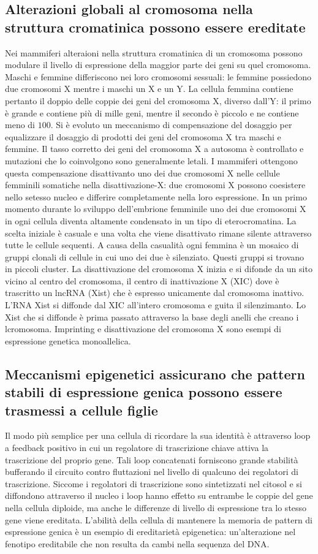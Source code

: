 \subsection{Alterazioni globali al cromosoma nella struttura cromatinica possono essere ereditate}
Nei mammiferi alteraioni nella struttura cromatinica di un cromosoma possono modulare il livello di espressione della maggior parte dei geni su quel cromosoma. Maschi e femmine 
differiscono nei loro cromosomi sessuali: le femmine possiedono due cromosomi X mentre i maschi un X e un Y. La cellula femmina contiene pertanto il doppio delle coppie dei geni del 
cromosoma X, diverso dall'Y: il primo \`e grande e contiene pi\`u di mille geni, mentre il secondo \`e piccolo e ne contiene meno di $100$. Si \`e evoluto un meccanismo di compensazione
del dosaggio per equalizzare il dosaggio di prodotti dei geni del cromosoma X tra maschi e femmine. Il tasso corretto dei geni del cromosoma X a autosoma \`e controllato e mutazioni che
lo coinvolgono sono generalmente letali. I mammiferi ottengono questa compensazione disattivanto uno dei due cromosomi X nelle cellule femminili somatiche nella disattivazione-X: due
cromosomi X possono coesistere nello setesso nucleo e differire completamente nella loro espressione. In un primo momento durante lo sviluppo dell'embrione femminile uno dei due 
cromosomi X in ogni cellula diventa altamente condensato in un tipo di eterocromatina. La scelta iniziale \`e casuale e una volta che viene disattivato rimane silente attraverso tutte
le cellule sequenti. A causa della casualit\`a ogni femmina \`e un mosaico di gruppi clonali di cellule in cui uno dei due \`e silenziato. Questi gruppi si trovano in piccoli cluster.
La disattivazione del cromosoma X inizia e si difonde da un sito vicino al centro del cromosoma, il centro di inattivazione X (XIC) dove \`e trascritto un lncRNA (Xist) che \`e 
espresso unicamente dal cromosoma inattivo. L'RNA Xist si diffonde dal XIC all'intero cromosoma e guita il silenzimanto. Lo Xist che si diffonde \`e prima passato attraverso la base 
degli anelli che creano i lcromosoma. Imprinting e disattivazione del cromosoma X sono esempi di espressione genetica monoallelica. 
\subsection{Meccanismi epigenetici assicurano che pattern stabili di espressione genica possono essere trasmessi a cellule figlie}
Il modo pi\`u semplice per una cellula di ricordare la sua identit\`a \`e attraverso loop a feedback positivo in cui un regolatore di trascrizione chiave attiva la trascrizione del
proprio gene. Tali loop concatenati forniscono grande stabilit\`a bufferando il circuito contro fluttazioni nel livello di qualcuno dei regolatori di trascrizione. Siccome i regolatori
di trascrizione sono sintetizzati nel citosol e si diffondono attraverso il nucleo i loop hanno effetto su entrambe le coppie del gene nella cellula diploide, ma anche le differenze 
di livello di espressione tra lo stesso gene viene ereditata. L'abilit\`a della cellula di mantenere la memoria de pattern di espressione genica \`e un esempio di ereditariet\`a
epigenetica: un'alterazione nel fenotipo ereditabile che non resulta da cambi nella sequenza del DNA. 
